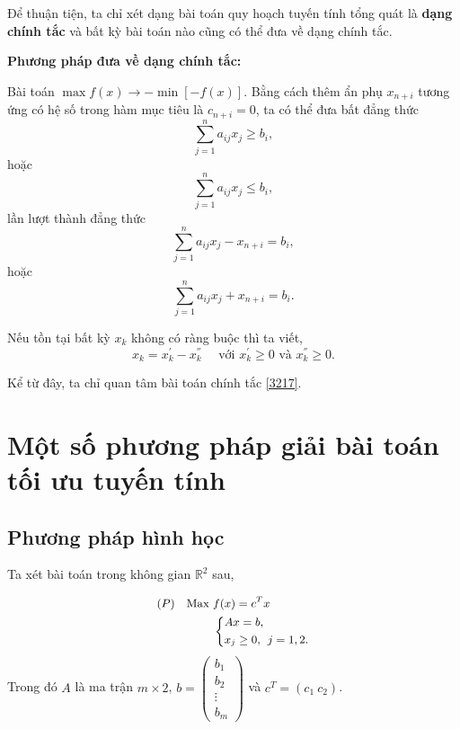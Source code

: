 \documentclass[12pt,a4paper]{report}
\begin{document}
Để thuận tiện, ta chỉ xét dạng bài toán quy hoạch tuyến tính tổng quát là \textbf{dạng chính tắc} và bất kỳ bài toán nào cũng có thể đưa về dạng chính tắc.


 \textbf{Phương pháp đưa về dạng chính tắc:}
    
     Bài toán $\max f(x) \longrightarrow -\min [-f(x)]$.
     Bằng cách thêm ẩn phụ $x_{n+i}$ tương ứng có hệ số trong hàm mục tiêu là $c_{n+i}=0$, ta có thể đưa bất đẳng thức 
    \begin{equation*}
    \sum _{j=1}^n a_{ij} x_j \geq b_i,
    \end{equation*}
    hoặc
    \begin{equation*}
    \sum _{j=1}^n a_{ij} x_j \leq b_i,
    \end{equation*}
    lần lượt thành đẳng thức
    \begin{equation*}
    \sum _{j=1}^n a_{ij} x_j - x_{n+i} = b_i,
    \end{equation*}
    hoặc
    \begin{equation*}
    \sum _{j=1}^n a_{ij} x_j + x_{n+i} = b_i.
    \end{equation*}
     
     Nếu tồn tại bất kỳ $x_k$ không có ràng buộc thì ta viết,
    \begin{equation*}
    x_k = x_k^{'} - x_k^{''} \quad \text{ với } x_k^{'} \geq 0 \text{ và } x_k^{''} \geq 0.
    \end{equation*}
    

Kể từ đây, ta chỉ quan tâm bài toán chính tắc \eqref{3217}.


\section{Một số phương pháp giải bài toán tối ưu tuyến tính}

\subsection{Phương pháp hình học}
Ta xét bài toán trong không gian $\mathbb{R}^2$ sau,

\begin{equation} \small \label{chinhtachinhhoc}
	\begin{split}
	(P) \quad \text{Max } & f(x) = c^Tx \\
		& \left\{
		\begin{split}
		& Ax=b, \\
		& x_j \geq 0, \:\: j=1,2.
		\end{split}
		\right.    
	\end{split}
\end{equation}
Trong đó $A$ là ma trận $m\times 2$, $b=\begin{pmatrix}
	b_1 \\
	b_2 \\
	\vdots \\
	b_m
	\end{pmatrix}$ và $c^T=(c_1 \: c_2 )$.
\end{document}

